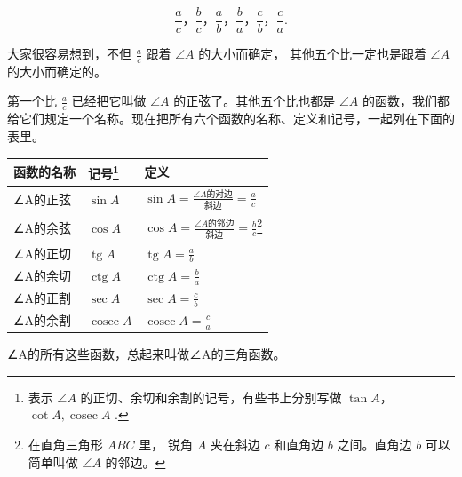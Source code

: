 \[
\frac {a}{c}\text{，} \frac {b}{c}\text{，} \frac {a}{b}\text{，} \frac {b}{a}\text{，} \frac {c}{b}\text{，} \frac {c}{a}.
\]

大家很容易想到，不但 \(\frac{a}{c}\) 跟着 \(\angle A\) 的大小而确定，
其他五个比一定也是跟着 \(\angle A\) 的大小而确定的。

第一个比 \(\frac{a}{c}\) 已经把它叫做 \(\angle A\)
的正弦了。其他五个比也都是 \(\angle A\)
的函数，我们都给它们规定一个名称。现在把所有六个函数的名称、定义和记号，一起列在下面的表里。

{\def\LTcaptype{none} %
\begin{longtable}[]{@{}
  >{\raggedright\arraybackslash}p{}
  >{\raggedright\arraybackslash}p{}
  >{\raggedright\arraybackslash}p{}@{}}
\toprule\noalign{}
\begin{minipage}[b]{\linewidth}\raggedright
函数的名称
\end{minipage} & \begin{minipage}[b]{\linewidth}\raggedright
记号\footnote{表示 \(\angle A\)
  的正切、余切和余割的记号，有些书上分别写做 \(\tan A\)，
  \(\cot A, \operatorname{cosec} A\) .}
\end{minipage} & \begin{minipage}[b]{\linewidth}\raggedright
定义
\end{minipage} \\
\midrule\noalign{}
\endhead
\bottomrule\noalign{}
\endlastfoot
∠A的正弦 & \(\sin A\) &
\(\sin A=\frac{\angle A\text{的对边}}{\text{斜边}}=\frac ac\) \\
∠A的余弦 & \(\cos A\) &
\(\cos A=\frac{\angle A\text{的邻边}}{\text{斜边}}=\frac bc\)\footnote{在直角三角形
  \(ABC\) 里， 锐角 \(A\) 夹在斜边 \(c\) 和直角边 \(b\) 之间。直角边
  \(b\) 可以简单叫做 \(\angle A\) 的邻边。} \\
∠A的正切 & \(\operatorname{tg}A\) & \(\operatorname{tg}A=\frac ab\) \\
∠A的余切 & \(\operatorname{ctg}A\) & \(\operatorname{ctg}A=\frac ba\) \\
∠A的正割 & \(\sec A\) & \(\sec A=\frac cb\) \\
∠A的余割 & \(\operatorname{cosec}A\) &
\(\operatorname{cosec}A=\frac ca\) \\
\end{longtable}
}

∠A的所有这些函数，总起来叫做∠A的三角函数。

